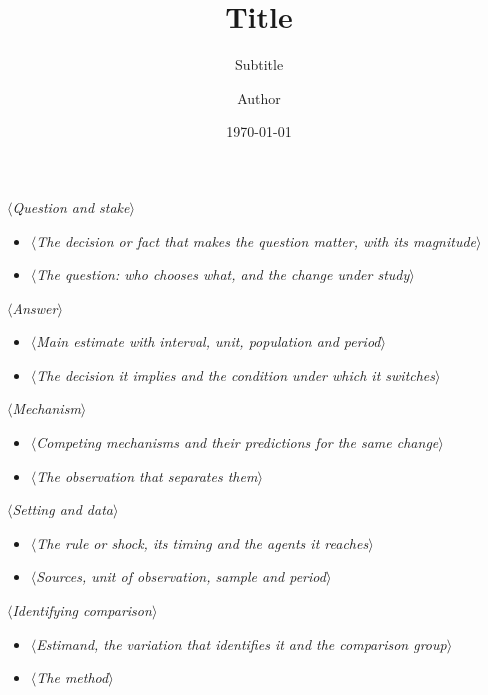 \documentclass[unicode, t, 12pt, aspectratio=169, unknownkeysallowed]{beamer}
\title{Title}
\subtitle{Subtitle}
\author{Author}
\institute{University}
\date{\today}
\providecommand{\slot}[1]{{\color{gray}\itshape\ensuremath{\langle}#1\ensuremath{\rangle}}}
\begin{document}
\begin{frame}[plain,b]
 \titlepage
\end{frame}

\begin{frame}{\slot{Question and stake}}
    \begin{itemize}
        \item \slot{The decision or fact that makes the question matter, with its magnitude}
        \item \slot{The question: who chooses what, and the change under study}
    \end{itemize}
\end{frame}

\begin{frame}{\slot{Answer}}
    \begin{itemize}
        \item \slot{Main estimate with interval, unit, population and period}
        \item \slot{The decision it implies and the condition under which it switches}
    \end{itemize}
\end{frame}

\begin{frame}{\slot{Mechanism}}
    \begin{itemize}
        \item \slot{Competing mechanisms and their predictions for the same change}
        \item \slot{The observation that separates them}
    \end{itemize}
\end{frame}

\begin{frame}{\slot{Setting and data}}
    \begin{itemize}
        \item \slot{The rule or shock, its timing and the agents it reaches}
        \item \slot{Sources, unit of observation, sample and period}
    \end{itemize}
\end{frame}

\begin{frame}{\slot{Identifying comparison}}
    \begin{itemize}
        \item \slot{Estimand, the variation that identifies it and the comparison group}
        \item \slot{The method}
    \end{itemize}
\end{frame}
\end{document}
